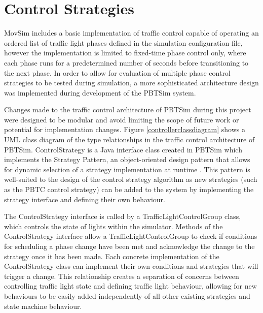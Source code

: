 
\section{Control Strategies}

MovSim includes a basic implementation of traffic control capable of operating an ordered list of traffic light phases defined in the simulation configuration file, however the implementation is limited to fixed-time phase control only, where each phase runs for a predetermined number of seconds before transitioning to the next phase. In order to allow for evaluation of multiple phase control strategies to be tested during simulation, a more sophisticated architecture design was implemented during development of the PBTSim system. 

Changes made to the traffic control architecture of PBTSim during this project were designed to be modular and avoid limiting the scope of future work or potential for implementation changes. Figure \ref{controllerclassdiagram} shows a UML class diagram of the type relationships in the traffic control architecture of PBTSim. ControlStrategy is a Java interface class created in PBTSim which implements the Strategy Pattern, an object-oriented design pattern that allows for dynamic selection of a strategy implementation at runtime \cite{gangof4}. This pattern is well-suited to the design of the control strategy algorithm as new strategies (such as the PBTC control strategy) can be added to the system by implementing the strategy interface and defining their own behaviour. 

The ControlStrategy interface is called by a TrafficLightControlGroup class, which controls the state of lights within the simulator. Methods of the ControlStrategy interface allow a TrafficLightControlGroup to check if conditions for scheduling a phase change have been met and acknowledge the change to the strategy once it has been made. Each concrete implementation of the ControlStrategy class can implement their own conditions and strategies that will trigger a change. This relationship creates a separation of concerns between controlling traffic light state and defining traffic light behaviour, allowing for new behaviours to be easily added independently of all other existing strategies and state machine behaviour.


